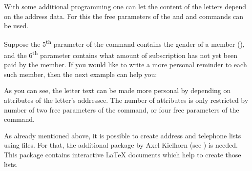 With some additional programming one can let the content of the
letters depend on the address data. For this the free parameters of
the  and and  commands can be used.

\begin{Example}
  Suppose the 5\textsuperscript{th} parameter of the 
  command contains the gender of a member (), and the
  6\textsuperscript{th} parameter contains what amount of subscription
  has not yet been paid by the member. If you would like to write a
  more personal reminder to each such member, then the next example
  can help you:
\begin{lstcode}
  \renewcommand*{\adrentry}[8]{
    \ifdim #6pt>0pt\relax
      \begin{letter}{#2 #1\\#3}
        \if #5m \opening{Dear Mr.\,#2,} \fi
        \if #5f \opening{Dear Mrs.\,#2,} \fi

        Unfortunately we have to remind you that you have
        still not paid the member subscription for this
        year.

        Please remit EUR #6 to the account of the society.
       \closing{Regards,}
      \end{letter}
     \fi
  }
\end{lstcode}
\end{Example}
As you can see, the letter text can be made more personal by depending on
attributes of the letter's addressee.  The number of attributes is only
restricted by number of two free parameters of the  command,
or four free parameters of the  command.


\begin{Declaration}
\end{Declaration}
%
As already mentioned above, it is possible to create address and telephone
lists using  files.  For that, the additional package
 by Axel Kielhorn (see \cite{package:adrconv}) is needed.
This package contains interactive {\LaTeX} documents which help to create
those lists.

